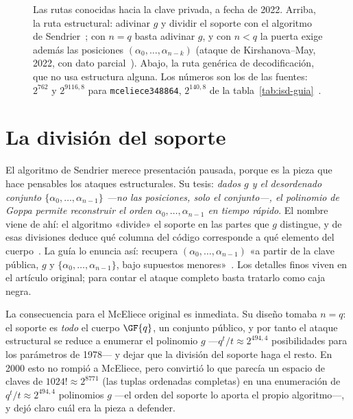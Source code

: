 \begin{figure}[htbp]
\caption{Las rutas conocidas hacia la clave privada, a fecha de 2022.
Arriba, la ruta estructural: adivinar $g$ y dividir el soporte con el
algoritmo de Sendrier~\cite{sendrier2000}; con $n=q$ basta adivinar
$g$, y con $n<q$ la puerta exige además las posiciones
$(\alpha_0,\dots,\alpha_{n-k})$ (ataque de Kirshanova--May, 2022, con
dato parcial~\cite{kirshanova2022}). Abajo, la ruta genérica de
decodificación, que no usa estructura alguna. Los números son los de
las fuentes: $2^{762}$ y $2^{9116{,}8}$ para \texttt{mceliece348864},
$2^{140{,}8}$ de la tabla~\ref{tab:isd-guia}~\cite{cmsecurity}.}
\label{fig:est-rutas}
\end{figure}

\section{La división del soporte}\label{sec:est-support}

El algoritmo de Sendrier merece presentación pausada, porque es la
pieza que hace pensables los ataques estructurales. Su tesis:
\emph{dados $g$ y el desordenado conjunto $\{\alpha_0,\dots,\alpha_{n-1}\}$
---no las posiciones, solo el conjunto---, el polinomio de Goppa
permite reconstruir el orden $\alpha_0,\dots,\alpha_{n-1}$ en tiempo
rápido}. El nombre viene de ahí: el algoritmo «divide» el soporte en
las partes que $g$ distingue, y de esas divisiones deduce qué
columna del código corresponde a qué elemento del
cuerpo~\cite{sendrier2000}. La guía lo enuncia así: recupera
$(\alpha_0,\dots,\alpha_{n-1})$ «a partir de la clave pública, $g$
y $\{\alpha_0,\dots,\alpha_{n-1}\}$, bajo supuestos
menores»~\cite{cmsecurity}. Los detalles finos viven en el artículo
original; para contar el ataque completo basta tratarlo como caja
negra.

La consecuencia para el McEliece original es inmediata. Su diseño
tomaba $n=q$: el soporte es \emph{todo} el cuerpo $\GF{q}$, un
conjunto público, y por tanto el ataque estructural se reduce a
enumerar el polinomio $g$ ---$q^t/t\approx 2^{494{,}4}$ posibilidades
para los parámetros de 1978--- y dejar que la división del soporte
haga el resto. En 2000 esto no rompió a McEliece, pero convirtió lo
que parecía un espacio de claves de $1024!\approx 2^{8771}$ (las
tuplas ordenadas completas) en una enumeración de $q^{t}/t\approx
2^{494{,}4}$ polinomios $g$ ---el orden del soporte lo aporta el
propio algoritmo---, y dejó claro cuál era la pieza a defender.

